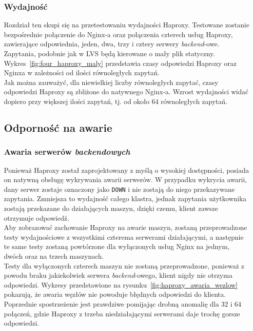 \subsubsection{Wydajność}
Rozdział ten skupi się na przetestowaniu wydajności Haproxy.
Testowane zostanie bezpośrednie połączenie do Nginx-a oraz połączenia czterech usług Haproxy, zawierające odpowiednia, jeden, dwa, trzy i cztery serwery \textit{backend}-owe.\\
Zapytania, podobnie jak w LVS będą kierowane o mały plik statyczny.
Wykres~\ref{fig:four_haproxy_maly} przedstawia czasy odpowiedzi Haproxy oraz Nginxa w zależności od ilości równoległych zapytań.\\
Jak można zauważyć, dla niewielkiej liczby równoległych zapytać, czasy odpowiedzi Haproxy są zbliżone do natywnego Nginx-a.
Wzrost wydajności widać dopiero przy większej ilości zapytań, tj. od około 64 równoległych zapytań.
\subsection{Odporność na awarie}
\subsubsection{Awaria serwerów \textit{backendowych}}
Ponieważ Haproxy został zaprojektowany z myślą o wysokiej dostępności, posiada on natywną obsługę wykrywania awarii serwerów.
W przypadku wykrycia awarii, dany serwer zostaje oznaczony jako \texttt{DOWN} i nie zostają do niego przekazywane zapytania.
Zmniejsza to wydajność całego klastra, jednak zapytania użytkownika zostają przekazane do działających maszyn, dzięki czemu, klient zawsze otrzymuje odpowiedź.\\
Aby zobrazować zachowanie Haproxy na awarie maszyn, zostaną przeprowadzone testy wydajnościowe z wszystkimi czterema serwerami działającymi, a następnie te same testy zostaną powtórzone dla wyłączonych usług Nginx na jednym, dwóch oraz na trzech maszynach.\\
Testy dla wyłączonych czterech maszyn nie zostaną przeprowadzone, ponieważ z powodu braku jakiekolwiek serwera \textit{backend}-owego, klient nigdy nie otrzyma odpowiedzi.
Wykresy przedstawione na rysunku~\ref{fig:haproxy_awaria_wezlow} pokazują, że awaria węzłów nie powoduje błędnych odpowiedzi do klienta.
Poprzednie spostrzeżenie jest prawdziwe pomijając drobną anomalię dla 32 i 64 połączeń, gdzie Haproxy z trzeba niedziałającymi serwerami daje trochę gorsze odpowiedzi.

